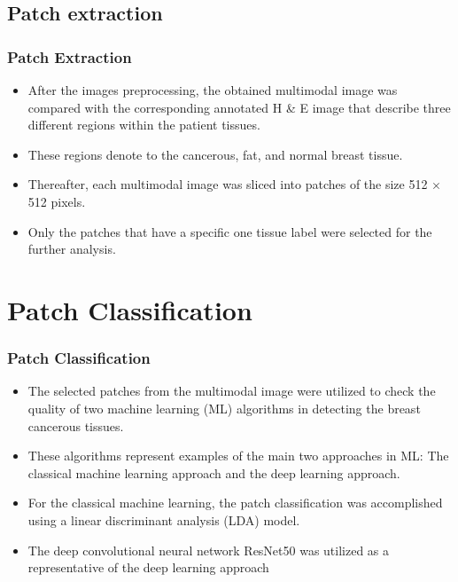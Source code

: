 \documentclass{beamer}
\begin{document}
\subsection{Patch extraction}
\begin{frame}
\frametitle{Patch Extraction}
\begin{itemize}
   \item After the images preprocessing, the obtained multimodal image was compared with the corresponding annotated H \& E image that describe three different regions within the patient tissues.
   \item These regions denote to the cancerous, fat, and normal breast tissue.
   \item   Thereafter, each multimodal image was sliced into patches of the size 512 $\times$ 512 pixels.
   \item Only the patches that have a specific one tissue label were selected for the further analysis.
\end{itemize}

\end{frame}


\section{Patch Classification}
\begin{frame}
\frametitle{Patch Classification}
\begin{itemize}
   \item The selected patches from the multimodal image were utilized to check the quality of two machine learning (ML) algorithms in detecting the breast cancerous tissues. 
   \item These algorithms represent examples of the main two approaches in ML: The classical machine learning approach and the deep learning approach. 
   \item  For the classical machine learning, the patch classification was accomplished using a linear discriminant analysis (LDA) model.
   \item The deep convolutional neural network ResNet50 was utilized as a representative of the deep learning approach
\end{itemize}

\end{frame}
\end{document}
